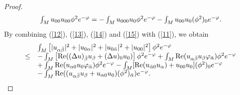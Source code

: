 \documentclass[12pt]{amsart}%
\numberwithin{equation}{section}
\begin{document}
\begin{proof}
\begin{equation}
\begin{array}
[c]{c}%
\int_{M}u_{00}u_{00}\phi^{2}e^{-\varphi}=-\int_{M}u_{000}u_{0}\phi
^{2}e^{-\varphi}-\int_{M}u_{00}u_{0}(\phi^{2})_{0}e^{-\varphi}.
\end{array}
\label{15}%
\end{equation}
By combining (\ref{12}), (\ref{13}), (\ref{14}) and (\ref{15}) with
(\ref{11}), we obtain%
\begin{equation}%
\begin{array}
[c]{ll}
& \int_{M}\left[  |u_{\alpha\bar{\beta}}|^{2}+|u_{0\alpha}|^{2}+|u_{0\bar
{\alpha}}|^{2}+|u_{00}|^{2}\right]  \phi^{2}e^{-\varphi}\\
\leq & -\int_{M}\left[  \mathrm{\operatorname{Re}}((\Delta u)_{\bar{\beta}%
}u_{\beta}+(\Delta u)_{0}u_{0})\right]  \phi^{2}e^{-\varphi}+\int
_{M}\operatorname{Re}(u_{\alpha\bar{\beta}}u_{\beta}\varphi_{\bar{\alpha}%
})\phi^{2}e^{-\varphi}\\
& +\int_{M}\operatorname{Re}(u_{\alpha0}u_{0}\varphi_{\bar{\alpha}})\phi
^{2}e^{-\varphi}-\int_{M}[\mathrm{\operatorname{Re}}(u_{\bar{\alpha}%
0}u_{\alpha})+u_{00}u_{0}](\phi^{2})_{0}e^{-\varphi}\\
& -\int_{M}\operatorname{Re}((u_{\alpha\bar{\beta}}u_{\beta}+u_{\alpha0}%
u_{0})(\phi^{2})_{\bar{\alpha}})e^{-\varphi}.
\end{array}
\label{16}%
\end{equation}



\end{proof}
\end{document}

